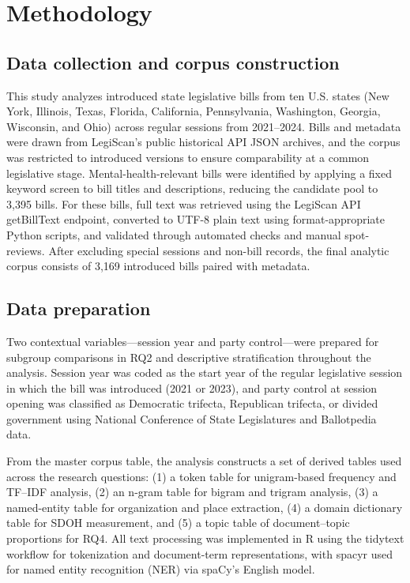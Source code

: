 \documentclass[10pt,twocolumn]{article}
\begin{document}
\section{Methodology}\label{methodology}

\subsection{Data collection and corpus
construction}\label{data-collection-and-corpus-construction}

This study analyzes introduced state legislative bills from ten U.S.
states (New York, Illinois, Texas, Florida, California, Pennsylvania,
Washington, Georgia, Wisconsin, and Ohio) across regular sessions from
2021--2024. Bills and metadata were drawn from LegiScan's public
historical API JSON archives, and the corpus was restricted to
introduced versions to ensure comparability at a common legislative
stage. Mental-health-relevant bills were identified by applying a fixed
keyword screen to bill titles and descriptions, reducing the candidate
pool to 3,395 bills. For these bills, full text was retrieved using the
LegiScan API getBillText endpoint, converted to UTF-8 plain text using
format-appropriate Python scripts, and validated through automated
checks and manual spot-reviews. After excluding special sessions and
non-bill records, the final analytic corpus consists of 3,169 introduced
bills paired with metadata.

\subsection{Data preparation}\label{data-preparation}

Two contextual variables---session year and party control---were
prepared for subgroup comparisons in RQ2 and descriptive stratification
throughout the analysis. Session year was coded as the start year of the
regular legislative session in which the bill was introduced (2021 or
2023), and party control at session opening was classified as Democratic
trifecta, Republican trifecta, or divided government using National
Conference of State Legislatures and Ballotpedia data.

From the master corpus table, the analysis constructs a set of derived
tables used across the research questions: (1) a token table for
unigram-based frequency and TF--IDF analysis, (2) an n-gram table for
bigram and trigram analysis, (3) a named-entity table for organization
and place extraction, (4) a domain dictionary table for SDOH
measurement, and (5) a topic table of document--topic proportions for
RQ4. All text processing was implemented in R using the tidytext
workflow for tokenization and document-term representations, with spacyr
used for named entity recognition (NER) via spaCy's English model.
\end{document}
